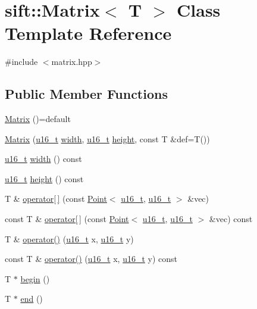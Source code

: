 \hypertarget{classsift_1_1Matrix}{}\section{sift\+:\+:Matrix$<$ T $>$ Class Template Reference}
\label{classsift_1_1Matrix}


{\ttfamily \#include $<$matrix.\+hpp$>$}

\subsection*{Public Member Functions}
\begin{DoxyCompactItemize}
\item 
\hyperlink{classsift_1_1Matrix_ade60ce7eb94a47ea781236541e6dac6a}{Matrix} ()=default
\item 
\hyperlink{classsift_1_1Matrix_a8620e2f90c85d3eb1f929043be06af89}{Matrix} (\hyperlink{types_8hpp_a4f53bd979bf45b1ce27e5f43e3a0d33b}{u16\+\_\+t} \hyperlink{classsift_1_1Matrix_a89f2de95ccd41c087fe100f102082afa}{width}, \hyperlink{types_8hpp_a4f53bd979bf45b1ce27e5f43e3a0d33b}{u16\+\_\+t} \hyperlink{classsift_1_1Matrix_ae8458afb8d81cd4dc54ee7cf468656e1}{height}, const T \&def=T())
\item 
\hyperlink{types_8hpp_a4f53bd979bf45b1ce27e5f43e3a0d33b}{u16\+\_\+t} \hyperlink{classsift_1_1Matrix_a89f2de95ccd41c087fe100f102082afa}{width} () const 
\item 
\hyperlink{types_8hpp_a4f53bd979bf45b1ce27e5f43e3a0d33b}{u16\+\_\+t} \hyperlink{classsift_1_1Matrix_ae8458afb8d81cd4dc54ee7cf468656e1}{height} () const 
\item 
T \& \hyperlink{classsift_1_1Matrix_a9485647c725a8d1763099e632c01fa1d}{operator\mbox{[}$\,$\mbox{]}} (const \hyperlink{classsift_1_1Point}{Point}$<$ \hyperlink{types_8hpp_a4f53bd979bf45b1ce27e5f43e3a0d33b}{u16\+\_\+t}, \hyperlink{types_8hpp_a4f53bd979bf45b1ce27e5f43e3a0d33b}{u16\+\_\+t} $>$ \&vec)
\item 
const T \& \hyperlink{classsift_1_1Matrix_a272099b4f7781c96363484fb35dca216}{operator\mbox{[}$\,$\mbox{]}} (const \hyperlink{classsift_1_1Point}{Point}$<$ \hyperlink{types_8hpp_a4f53bd979bf45b1ce27e5f43e3a0d33b}{u16\+\_\+t}, \hyperlink{types_8hpp_a4f53bd979bf45b1ce27e5f43e3a0d33b}{u16\+\_\+t} $>$ \&vec) const 
\item 
T \& \hyperlink{classsift_1_1Matrix_ad5aedd1c3fa69a2964fbbec24c4f183d}{operator()} (\hyperlink{types_8hpp_a4f53bd979bf45b1ce27e5f43e3a0d33b}{u16\+\_\+t} x, \hyperlink{types_8hpp_a4f53bd979bf45b1ce27e5f43e3a0d33b}{u16\+\_\+t} y)
\item 
const T \& \hyperlink{classsift_1_1Matrix_a433507187c9403136c2e5babc0cc6c66}{operator()} (\hyperlink{types_8hpp_a4f53bd979bf45b1ce27e5f43e3a0d33b}{u16\+\_\+t} x, \hyperlink{types_8hpp_a4f53bd979bf45b1ce27e5f43e3a0d33b}{u16\+\_\+t} y) const 
\item 
T $\ast$ \hyperlink{classsift_1_1Matrix_ad86f15c5d8e9f1958e5c014e36385c67}{begin} ()
\item 
T $\ast$ \hyperlink{classsift_1_1Matrix_ab39098a1b58c287c927fc8bea6d417a0}{end} ()
\end{DoxyCompactItemize}
